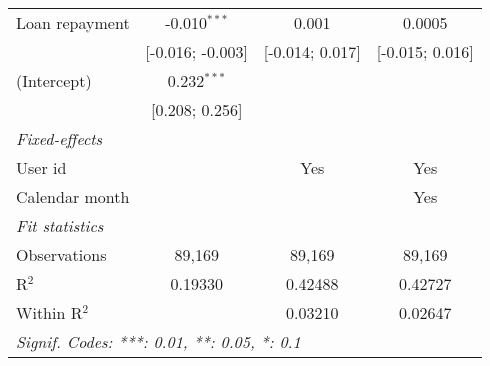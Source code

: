 \begin{table}[htbp]
\begin{threeparttable}[b]
\begin{tabular}{lccc}
         Loan repayment      & -0.010$^{***}$   & 0.001            & 0.0005\\   
                             & [-0.016; -0.003] & [-0.014; 0.017]  & [-0.015; 0.016]\\   
         (Intercept)         & 0.232$^{***}$    &                  &   \\   
                             & [0.208; 0.256]   &                  &   \\   
         \midrule
         \emph{Fixed-effects}\\
         User id             &                  & Yes              & Yes\\  
         Calendar month      &                  &                  & Yes\\  
         \midrule
         \emph{Fit statistics}\\
         Observations        & 89,169           & 89,169           & 89,169\\  
         R$^2$               & 0.19330          & 0.42488          & 0.42727\\  
         Within R$^2$        &                  & 0.03210          & 0.02647\\  
         \midrule \midrule
         \multicolumn{4}{l}{\emph{Signif. Codes: ***: 0.01, **: 0.05, *: 0.1}}\\
      \end{tabular}
   \end{threeparttable}
\end{table}


